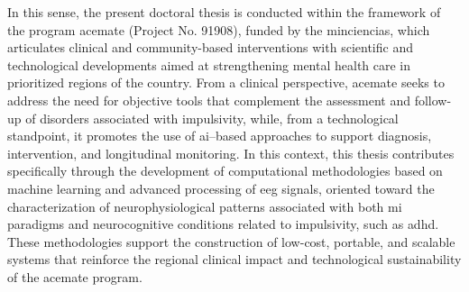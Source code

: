 In this sense, the present doctoral thesis is conducted within the framework of the program \gls{acemate} (Project No. 91908), funded by the \gls{minciencias}, which articulates clinical and community-based interventions with scientific and technological developments aimed at strengthening mental health care in prioritized regions of the country. From a clinical perspective, \gls{acemate} seeks to address the need for objective tools that complement the assessment and follow-up of disorders associated with impulsivity, while, from a technological standpoint, it promotes the use of \gls{ai}–based approaches to support diagnosis, intervention, and longitudinal monitoring. In this context, this thesis contributes specifically through the development of computational methodologies based on machine learning and advanced processing of \gls{eeg} signals, oriented toward the characterization of neurophysiological patterns associated with both \gls{mi} paradigms and neurocognitive conditions related to impulsivity, such as \gls{adhd}. These methodologies support the construction of low-cost, portable, and scalable systems that reinforce the regional clinical impact and technological sustainability of the \gls{acemate} program.